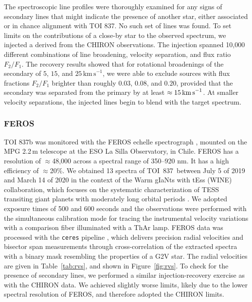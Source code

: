 \documentclass[12pt,twocolumn,tighten]{aastex63}
\newcommand{\tn}{TOI~837} %
\begin{document}
The spectroscopic line profiles were thoroughly examined for any signs
of secondary lines that might indicate the presence of another star,
either associated or in chance alignment with TOI 837. No such set of
lines was found. To set limits on the contributions of a close-by star
to the observed spectrum, we injected a  derived from the CHIRON
observations.  The injection spanned 10,000 different combinations of
line broadening, velocity separation, and flux ratio $F_2/F_1$.  The
recovery results showed that for rotational broadenings of the
secondary of $5$, $15$, and $25\,\mathrm{km\,s}^{-1}$, we were able to
exclude sources with flux fractions $F_2/F_1$ brighter than roughly
$0.03$, $0.08$, and $0.20$, provided that the secondary was separated
from the primary by at least $\approx 15\,{\rm km\,s}^{-1}$.  At
smaller velocity separations, the injected lines begin to blend with
the target spectrum.



\subsubsection{FEROS}
TOI 837b was monitored with the FEROS echelle spectrograph
\citep{kaufer_commissioning_1999}, mounted on the MPG 2.2$\,$m
telescope at the ESO La Silla Observatory, in Chile. FEROS has a
resolution of $\approx$48,000 across a spectral range of 350–920 nm.
It has a high efficiency of $\approx$20\%. We obtained 13
spectra of \tn\ between July 5 of 2019 and March 14 of 2020 in the
context of the Warm gIaNts with tEss (WINE) collaboration, which
focuses on the systematic characterization of TESS transiting giant
planets with moderately long orbital periods \citep[{\it
e.g.},][]{brahm:2019,jordan:2020}.  We adopted exposure times of 500
and 600 seconds and the observations were performed with the
simultaneous calibration mode for tracing the instrumental velocity
variations with a comparison fiber illuminated with a ThAr lamp. FEROS
data was processed with the \texttt{ceres} pipeline
\citep{brahm_2017_ceres}, which delivers precision radial velocities
and bisector span measurements through cross-correlation of the
extracted spectra with a binary mask resembling the properties of a
G2V star. The radial velocities are given in Table~\ref{tab:rvs}, and
shown in Figure~\ref{fig:rvs}.  To check for the presence of secondary
lines, we performed a similar injection-recovery exercise as with the
CHIRON data.  We achieved slightly worse limits, likely due to the
lower spectral resolution of FEROS, and therefore adopted the CHIRON
limits.
\end{document}
